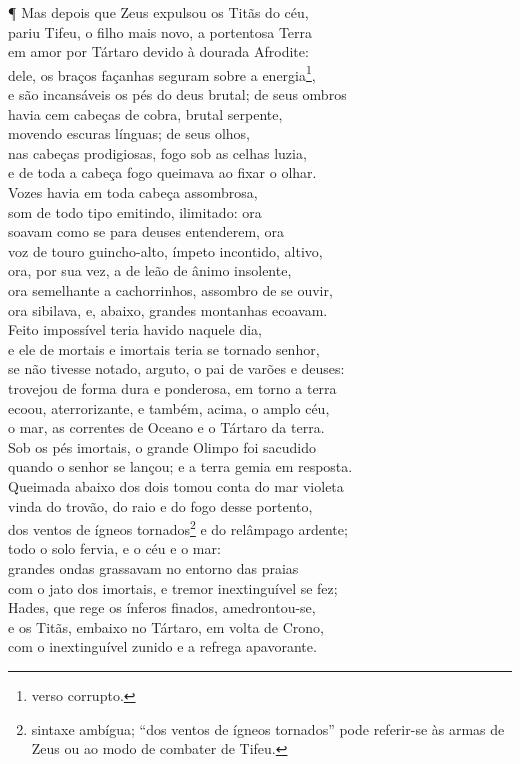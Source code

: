 ¶ Mas depois que Zeus expulsou os Titãs do céu, \\
pariu Tifeu, o filho mais novo, a portentosa Terra\\
em amor por Tártaro devido à dourada Afrodite:\\
dele, os braços \dagger{}façanhas seguram sobre a energia\footnote{verso corrupto.}\dagger{},\\
e são incansáveis os pés do deus brutal; de seus ombros\\
havia cem cabeças de cobra, brutal serpente, \\
movendo escuras línguas; de seus olhos,\\
nas cabeças prodigiosas, fogo sob as celhas luzia,\\
e de toda a cabeça fogo queimava ao fixar o olhar.\\
Vozes havia em toda cabeça assombrosa,\\
som de todo tipo emitindo, ilimitado: ora \\
soavam como se para deuses entenderem, ora\\
voz de touro guincho-alto, ímpeto incontido, altivo,\\
ora, por sua vez, a de leão de ânimo insolente,\\
ora semelhante a cachorrinhos, assombro de se ouvir,\\
ora sibilava, e, abaixo, grandes montanhas ecoavam. \\
Feito impossível teria havido naquele dia,\\
e ele de mortais e imortais teria se tornado senhor,\\
se não tivesse notado, arguto, o pai de varões e deuses:\\
trovejou de forma dura e ponderosa, em torno a terra\\
ecoou, aterrorizante, e também, acima, o amplo céu, \\
o mar, as correntes de Oceano e o Tártaro da terra.\\
Sob os pés imortais, o grande Olimpo foi sacudido\\
quando o senhor se lançou; e a terra gemia em resposta.\\
Queimada abaixo dos dois tomou conta do mar violeta\\
vinda do trovão, do raio e do fogo desse portento, \\
dos ventos de ígneos tornados\footnote{sintaxe ambígua; ``dos ventos de ígneos tornados'' pode referir-se às armas de Zeus ou ao modo de combater de Tifeu.} e do relâmpago ardente;\\
todo o solo fervia, e o céu e o mar:\\
grandes ondas grassavam no entorno das praias\\
com o jato dos imortais, e tremor inextinguível se fez;\\
Hades, que rege os ínferos finados, amedrontou-se, \\
e os Titãs, embaixo no Tártaro, em volta de Crono,\\
com o inextinguível zunido e a refrega apavorante.

